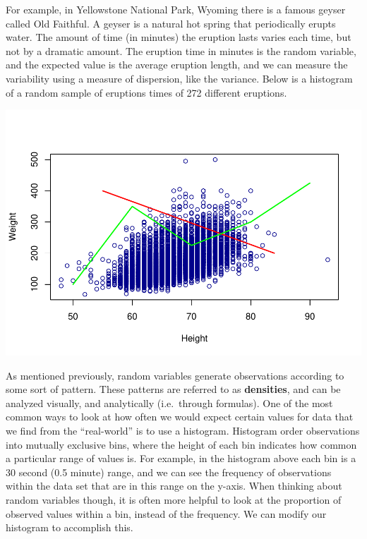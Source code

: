 \documentclass[
]{book}
\newenvironment{Shaded}{\begin{snugshade}}{\end{snugshade}}
\newcommand{\DataTypeTok}[1]{\textcolor[rgb]{0.13,0.29,0.53}{#1}}
\newcommand{\DecValTok}[1]{\textcolor[rgb]{0.00,0.00,0.81}{#1}}
\newcommand{\FloatTok}[1]{\textcolor[rgb]{0.00,0.00,0.81}{#1}}
\newcommand{\KeywordTok}[1]{\textcolor[rgb]{0.13,0.29,0.53}{\textbf{#1}}}
\newcommand{\NormalTok}[1]{#1}
\newcommand{\OperatorTok}[1]{\textcolor[rgb]{0.81,0.36,0.00}{\textbf{#1}}}
\newcommand{\StringTok}[1]{\textcolor[rgb]{0.31,0.60,0.02}{#1}}
\begin{document}
For example, in Yellowstone National Park, Wyoming there is a famous geyser called Old Faithful. A geyser is a natural hot spring that periodically erupts water. The amount of time (in minutes) the eruption lasts varies each time, but not by a dramatic amount. The eruption time in minutes is the random variable, and the expected value is the average eruption length, and we can measure the variability using a measure of dispersion, like the variance. Below is a histogram of a random sample of eruptions times of 272 different eruptions.

\begin{Shaded}
\end{Shaded}

\includegraphics{_main_files/figure-latex/unnamed-chunk-214-1.pdf}

As mentioned previously, random variables generate observations according to some sort of pattern. These patterns are referred to as \textbf{densities}, and can be analyzed visually, and analytically (i.e.~through formulas). One of the most common ways to look at how often we would expect certain values for data that we find from the ``real-world'' is to use a histogram. Histogram order observations into mutually exclusive bins, where the height of each bin indicates how common a particular range of values is. For example, in the histogram above each bin is a 30 second (0.5 minute) range, and we can see the frequency of observations within the data set that are in this range on the y-axis. When thinking about random variables though, it is often more helpful to look at the proportion of observed values within a bin, instead of the frequency. We can modify our histogram to accomplish this.
\end{document}
